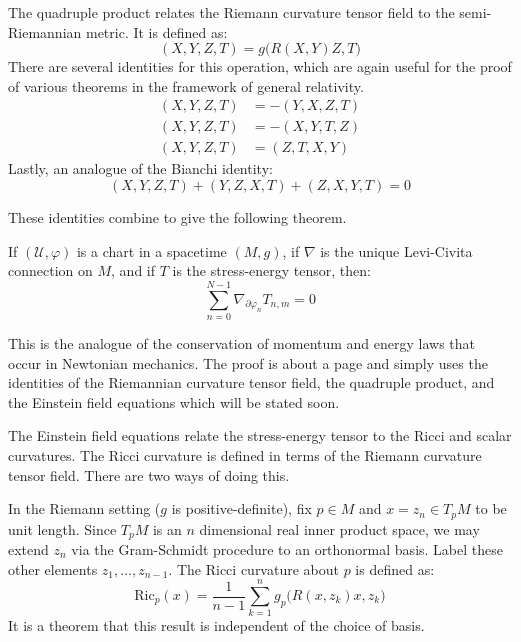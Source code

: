 \documentclass{beamer}
\begin{document}
    \begin{frame}
        The quadruple product relates the Riemann curvature tensor field to the
        semi-Riemannian metric. It is defined as:
        \begin{equation}
            (X,Y,Z,T)=g\big(R(X,Y)Z,T\big)
        \end{equation}
        There are several identities for this operation, which are again useful
        for the proof of various theorems in the framework of general
        relativity.
        \begin{align}
            (X,Y,Z,T)&=-(Y,X,Z,T)\\
            (X,Y,Z,T)&=-(X,Y,T,Z)\\
            (X,Y,Z,T)&=(Z,T,X,Y)
        \end{align}
        Lastly, an analogue of the Bianchi identity:
        \begin{equation}
            (X,Y,Z,T)+(Y,Z,X,T)+(Z,X,Y,T)=0
        \end{equation}
    \end{frame}
    \begin{frame}
        These identities combine to give the following theorem.
        \begin{theorem}
            If $(\mathcal{U},\varphi)$ is a chart in a spacetime $(M,g)$,
            if $\nabla$ is the unique Levi-Civita connection on $M$, and if
            $T$ is the stress-energy tensor, then:
            \begin{equation}
                \sum_{n=0}^{N-1}\nabla_{\partial\varphi_{n}}T_{n,m}=0
            \end{equation}
        \end{theorem}
        This is the analogue of the conservation of momentum and energy laws
        that occur in Newtonian mechanics. The proof is about a page and simply
        uses the identities of the Riemannian curvature tensor field, the
        quadruple product, and the Einstein field equations which will be
        stated soon.
    \end{frame}
    \begin{frame}
        The Einstein field equations relate the stress-energy tensor to the
        Ricci and scalar curvatures. The Ricci curvature is defined in terms of
        the Riemann curvature tensor field. There are two ways of doing this.
        \par\hfill\par
        In the Riemann setting ($g$ is positive-definite), fix $p\in{M}$ and
        $x=z_{n}\in{T}_{p}M$ to be unit length. Since $T_{p}M$ is an $n$
        dimensional real inner product space, we may extend $z_{n}$ via the
        Gram-Schmidt procedure to an orthonormal basis. Label these other
        elements $z_{1},\dots,z_{n-1}$. The Ricci curvature about $p$ is defined
        as:
        \begin{equation}
            \textrm{Ric}_{p}(x)=\frac{1}{n-1}\sum_{k=1}^{n}g_{p}
                \Big(R(x,z_{k})x,z_{k}\Big)
        \end{equation}
        It is a theorem that this result is independent of the choice of
        basis.
    \end{frame}
\end{document}

